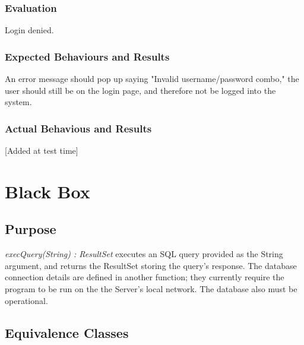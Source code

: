 \documentclass{article}
\begin{document}
\subsubsection{Evaluation}
Login denied.

\subsubsection{Expected Behaviours and Results}
An error message should pop up saying "Invalid username/password combo," the user should still be on the login page, and therefore not be logged into the system.

\subsubsection{Actual Behavious and Results}
[Added at test time]

\section{Black Box}
\subsection{Purpose}
\textit{execQuery(String) : ResultSet} executes an SQL query provided as the String argument, and returns the ResultSet storing the query's response.  The database connection details are defined in another function; they currently require the program to be run on the the Server's local network.  The database also must be operational.

\subsection{Equivalence Classes}
\end{document}
